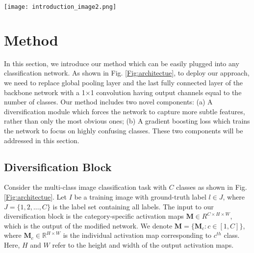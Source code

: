 \documentclass[letterpaper]{article} \usepackage{aaai20}  \usepackage{times}  \usepackage{helvet} \usepackage{courier}  \usepackage[hyphens]{url}  \usepackage{graphicx} \usepackage{multirow}
\begin{document}
\begin{figure*}[t]
\centering
\texttt{[image: introduction\_image2.png]}\\
\caption{Overview of our overall architecture. Our method contains two novel components: diversification block and gradient-boosting loss. The diversification block suppresses the discriminative regions of the class activation maps, and hence the network is forced to find alternative informative features. The gradient-booting loss focuses on difficult (confusing) classes for each image and boosts their gradient. As a result, the network moves swiftly (faster convergence) to discriminate the hard classes.}
			\label{Fig:architectue}
\end{figure*}

\section{Method}
In this section, we introduce our method which can be easily plugged into any classification network. As shown in Fig. \ref{Fig:architectue}, to deploy our approach, we need to replace global pooling layer and the last fully connected layer of the backbone network with a 1$\times$1 convolution having output channels equal to the number of classes. Our method includes two novel components: (a) A diversification module which forces the network to capture more subtle features, rather than only the most obvious ones; (b) A gradient boosting loss  which trains the network to focus on highly confusing classes. These two components will be addressed in this section.


\subsection{Diversification Block}\label{part_enhan}
Consider the multi-class image classification task with $C$ classes as shown in Fig. \ref{Fig:architectue}. Let $I$ be a training image with ground-truth label $l \in J$, where $J= \{1,2,...,C\}$ is the label set containing all labels. The input to our diversification block is the category-specific activation maps $\mathbf{M} \in R^{C \times H \times W}$, which is the output of the modified network. We denote $ \mathbf{M}=\{\mathbf{M}_c : c\in [1,C]\}$, where $\mathbf{M}_c \in \mathbb{R}^{H \times W}$ is the individual activation map corresponding to $c^{th}$ class.  Here, $H$ and $W$ refer to the height and width of the output activation maps.  
\end{document}
